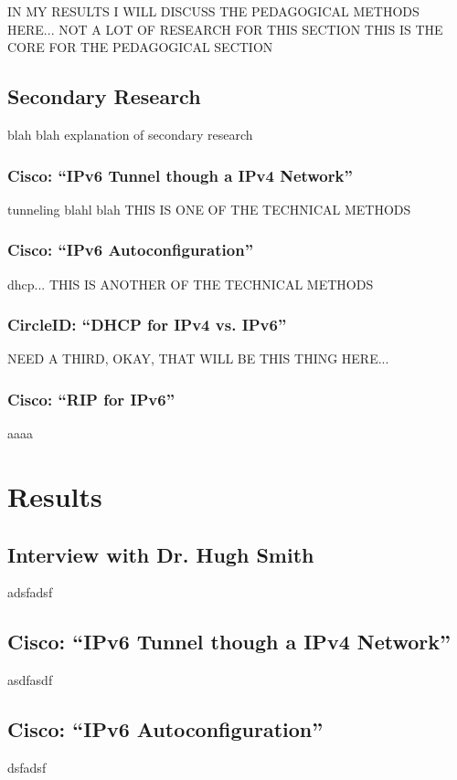 \documentclass[12pt]{article}
\begin{document}
IN MY RESULTS I WILL DISCUSS THE PEDAGOGICAL METHODS HERE... NOT A LOT OF RESEARCH FOR THIS SECTION
THIS IS THE CORE FOR THE PEDAGOGICAL SECTION


\subsection{Secondary Research}
blah blah explanation of secondary research


\subsubsection{Cisco: ``IPv6 Tunnel though a IPv4 Network''}
tunneling blahl blah  THIS IS ONE OF THE TECHNICAL METHODS


\subsubsection{Cisco: ``IPv6 Autoconfiguration''}
dhcp... THIS IS ANOTHER OF THE TECHNICAL METHODS


\subsubsection{CircleID: ``DHCP for IPv4 vs. IPv6''}
NEED A THIRD, OKAY, THAT WILL BE THIS THING HERE...

\subsubsection{Cisco: ``RIP for IPv6''}


aaaa

\section{Results}

\subsection{Interview with Dr. Hugh Smith}
adsfadsf
\subsection{Cisco: ``IPv6 Tunnel though a IPv4 Network''}
asdfasdf
\subsection{Cisco: ``IPv6 Autoconfiguration''}
dsfadsf
\end{document}
